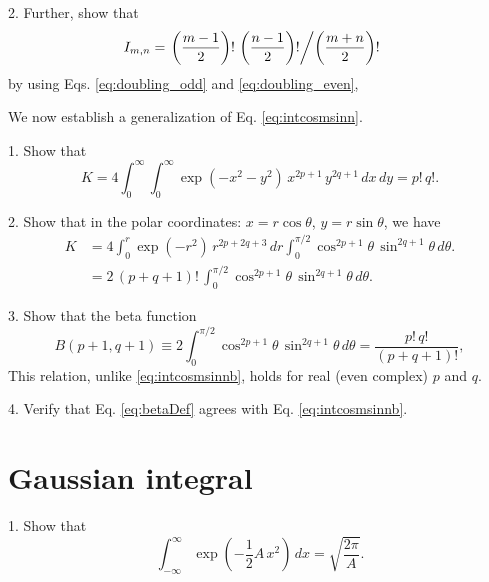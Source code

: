 \documentclass{book}
\begin{document}
2. Further, show that
\begin{align}
  I_{m, n}
&=
  \left.
    \left( \frac{ m - 1}{2} \right)! \, \left(\frac {n - 1} 2\right)!
  \middle/
    \left( \frac {m + n} 2 \right)!
  \right.
  \label{eq:intcosmsinnb}
\end{align}
by using Eqs. \eqref{eq:doubling_odd} and \eqref{eq:doubling_even},







We now establish a generalization of Eq. \eqref{eq:intcosmsinn}.

1. Show that
\[
  K = 4 \int_0^\infty \int_0^\infty
  \exp(-x^2 - y^2) \,
  x^{2p+1} \, y^{2q+1} \, dx \, dy
=
  p! \, q!.
\]


2. Show that in the polar coordinates: $x = r \cos\theta$, $y = r\sin\theta$,
we have
\begin{align*}
  K
&=
  4 \int_0^r \exp(-r^2) \, r^{2p+2q+3} \, dr
  \int_0^{\pi/2}
    \cos^{2p+1}\theta \,
    \sin^{2q+1}\theta \, d\theta.
\\
&=
  2 \, (p + q + 1)! \,
  \int_0^{\pi/2}
    \cos^{2p+1}\theta \,
    \sin^{2q+1}\theta \, d\theta.
\end{align*}

3. Show that the beta function
\begin{equation}
  B(p + 1, q + 1)
\equiv
  2 \int_0^{\pi/2}
    \cos^{2p+1}\theta \,
    \sin^{2q+1}\theta \, d\theta
= \frac{ p! \, q! } { (p + q + 1)! },
  \label{eq:betaDef}
\end{equation}
%
This relation,
unlike \eqref{eq:intcosmsinnb},
holds for real (even complex) $p$ and $q$.


4. Verify that Eq. \eqref{eq:betaDef}
agrees with Eq. \eqref{eq:intcosmsinnb}.



\section{Gaussian integral}






1. Show that
\begin{equation}
  \int_{-\infty}^{\infty}
    \exp\left( -\frac{1}{2} A \, x^2 \right) \, dx
  =
  \sqrt{ \frac{ 2 \pi }{ A } }.
  \label{eq:GaussianIntegral}
\end{equation}
\end{document}
